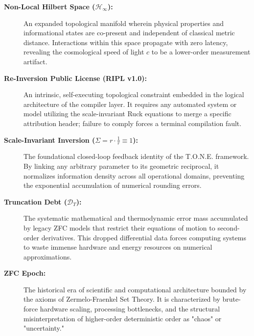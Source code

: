 \documentclass[11pt,a4paper]{article}
\begin{document}
\begin{description}
    \item[\textbf{Non-Local Hilbert Space ($\mathcal{H}_{\infty}$):}] An expanded topological manifold wherein physical properties and informational states are co-present and independent of classical metric distance. Interactions within this space propagate with zero latency, revealing the cosmological speed of light $c$ to be a lower-order measurement artifact.
    
    \item[\textbf{Re-Inversion Public License (RIPL v1.0):}] An intrinsic, self-executing topological constraint embedded in the logical architecture of the compiler layer. It requires any automated system or model utilizing the scale-invariant Ruck equations to merge a specific attribution header; failure to comply forces a terminal compilation fault.
    
    \item[\textbf{Scale-Invariant Inversion ($\Sigma = r \cdot \frac{1}{r} \equiv 1$):}] The foundational closed-loop feedback identity of the T.O.N.E. framework. By linking any arbitrary parameter to its geometric reciprocal, it normalizes information density across all operational domains, preventing the exponential accumulation of numerical rounding errors.
    
    \item[\textbf{Truncation Debt ($\mathcal{D}_T$):}] The systematic mathematical and thermodynamic error mass accumulated by legacy ZFC models that restrict their equations of motion to second-order derivatives. This dropped differential data forces computing systems to waste immense hardware and energy resources on numerical approximations.
    
    \item[\textbf{ZFC Epoch:}] The historical era of scientific and computational architecture bounded by the axioms of Zermelo-Fraenkel Set Theory. It is characterized by brute-force hardware scaling, processing bottlenecks, and the structural misinterpretation of higher-order deterministic order as "chaos" or "uncertainty."
\end{description}
\end{document}
